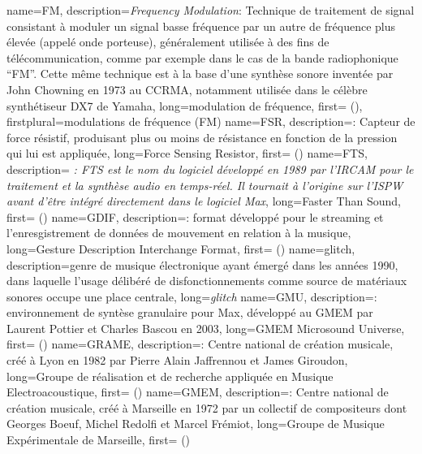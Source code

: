 {
    name={FM},
    description={\textit{Frequency Modulation}: Technique de traitement de signal consistant à moduler un signal basse fréquence par un autre de fréquence plus élevée (appelé onde porteuse), généralement utilisée à des fins de télécommunication, comme par exemple dans le cas de la bande radiophonique ``FM''. Cette même technique est à la base d'une synthèse sonore inventée par John Chowning en 1973 au \gls{CCRMA}, notamment utilisée dans le célèbre synthétiseur DX7 de Yamaha},
    long={modulation de fréquence},
    first={ ()},
    firstplural={modulations de fréquence (FM)}
}
{
    name={FSR},
    description={\textit{}: Capteur de force résistif, produisant plus ou moins de résistance en fonction de la pression qui lui est appliquée},
    long={Force Sensing Resistor},
    first={ ()}
}
{
    name={FTS},
    description={\textit{ : FTS est le nom du logiciel développé en 1989 par l'IRCAM pour le traitement et la synthèse audio en temps-réel. Il tournait à l'origine sur l'\gls{ISPW} avant d'être intégré directement dans le logiciel Max}},
    long={Faster Than Sound},
    first={ ()}
}
{
    name={GDIF},
    description={\textit{}: format développé pour le streaming et l'enresgistrement de données de mouvement en relation à la musique},
    long={Gesture Description Interchange Format},
    first={ ()}
}
{
    name={glitch},
    description={genre de musique électronique ayant émergé dans les années 1990, dans laquelle l'usage délibéré de disfonctionnements comme source de matériaux sonores occupe une place centrale},
    long={\textit{glitch}}
}
{
    name={GMU},
    description={\textit{}: environnement de syntèse granulaire pour Max, développé au \gls{GMEM} par Laurent Pottier et Charles Bascou en 2003},
    long={GMEM Microsound Universe},
    first={ ()}
}
{
    name={GRAME},
    description={\textit{}: Centre national de création musicale, créé à Lyon en 1982 par Pierre Alain Jaffrennou et James Giroudon},
    long={Groupe de réalisation et de recherche appliquée en Musique Electroacoustique},
    first={ ()}
}
{
    name={GMEM},
    description={\textit{}: Centre national de création musicale, créé à Marseille en 1972 par un collectif de compositeurs dont Georges Boeuf, Michel Redolfi et Marcel Frémiot},
    long={Groupe de Musique Expérimentale de Marseille},
    first={ ()}
}
